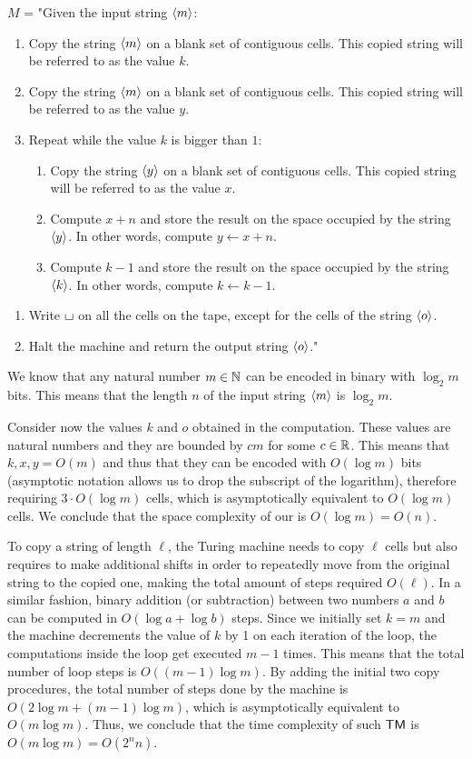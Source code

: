 $M$ = "Given the input string $\left\langle m\right\rangle$:
\begin{enumerate}
    \item Copy the string $\left\langle m\right\rangle$ on a blank set of contiguous cells. This copied string will be referred to as the value $k$.
    \item Copy the string $\left\langle m\right\rangle$ on a blank set of contiguous cells. This copied string will be referred to as the value $y$.
    \item Repeat while the value $k$ is bigger than $1$:
    \begin{enumerate}[label={\arabic*.}, start=3]
        \item Copy the string $\left\langle y\right\rangle$ on a blank set of contiguous cells. This copied string will be referred to as the value $x$.
        \item Compute $x + n$ and store the result on the space occupied by the string $\left\langle y\right\rangle$. In other words, compute $y \gets x + n$.
        \item Compute $k - 1$ and store the result on the space occupied by the string $\left\langle k\right\rangle$. In other words, compute $k \gets k - 1$.
    \end{enumerate}
\end{enumerate}
\begin{enumerate}[label={\arabic*.}, start=6]
    \item Write $\blankchar$ on all the cells on the tape, except for the cells of the string $\left\langle o\right\rangle$.
    \item Halt the machine and return the output string $\left\langle o\right\rangle$."
\end{enumerate}

We know that any natural number $m \in \mathbb{N}$ can be encoded in binary with $\log_2 m$ bits. This means that the length $n$ of the input string $\left\langle m\right\rangle$ is $\log_2 m$.

Consider now the values $k$ and $o$ obtained in the computation. These values are natural numbers and they are bounded by $cm$ for some $c \in \mathbb{R}$. This means that $k, x, y = O(m)$ and thus that they can be encoded with $O(\log m)$ bits (asymptotic notation allows us to drop the subscript of the logarithm), therefore requiring $3 \cdot O(\log m)$ cells, which is asymptotically equivalent to $O(\log m)$ cells. We conclude that the space complexity of our \TM is $O(\log m) = O(n)$.

To copy a string of length $\ell$, the Turing machine needs to copy $\ell$ cells but also requires to make additional shifts in order to repeatedly move from the original string to the copied one, making the total amount of steps required $O(\ell)$. In a similar fashion, binary addition (or subtraction) between two numbers $a$ and $b$ can be computed in $O(\log a + \log b)$ steps. Since we initially set $k = m$ and the machine decrements the value of $k$ by 1 on each iteration of the loop, the computations inside the loop get executed $m-1$ times. This means that the total number of loop steps is $O((m-1) \log m)$. By adding the initial two copy procedures, the total number of steps done by the machine is $O(2 \log m + (m-1) \log m)$, which is asymptotically equivalent to $O(m \log m)$. Thus, we conclude that the time complexity of such $\textsf{TM}$ is $O(m \log m) = O(2^n n)$.

